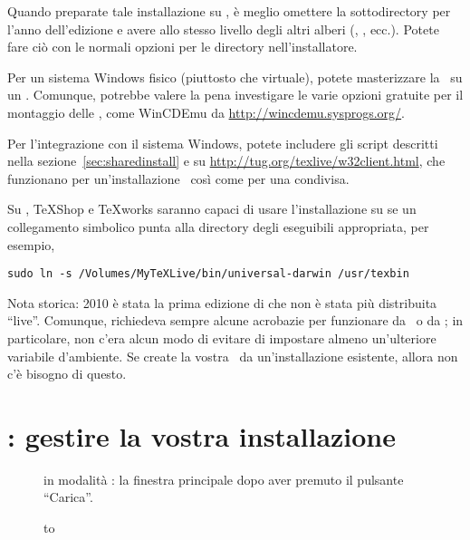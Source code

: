 \documentclass{article}
\begin{document}
Quando preparate tale installazione su \ISO, è meglio omettere la
sottodirectory per l'anno dell'edizione e avere  allo
stesso livello degli altri alberi (,
, ecc.). Potete fare ciò con le normali opzioni per le
directory nell'installatore.

Per un sistema Windows fisico (piuttosto che virtuale), potete masterizzare
la \ISO\ su un . Comunque, potrebbe valere la pena investigare le
varie opzioni gratuite per il montaggio delle \ISO, come WinCDEmu da
\url{http://wincdemu.sysprogs.org/}.

Per l'integrazione con il sistema Windows, potete includere gli script
 descritti nella sezione~\ref{sec:sharedinstall} e su
\url{http://tug.org/texlive/w32client.html}, che funzionano per
un'installazione \ISO\ così come per una condivisa.

Su \MacOSX, TeXShop e \TeX{}works saranno capaci di usare l'installazione su
 se un collegamento simbolico  punta alla
directory degli eseguibili appropriata, per esempio,
\begin{verbatim}
sudo ln -s /Volumes/MyTeXLive/bin/universal-darwin /usr/texbin
\end{verbatim}

Nota storica: \TL{} 2010 è stata la prima edizione di \TL{} che non è stata
più distribuita ``live''. Comunque, richiedeva sempre alcune acrobazie per
funzionare da \DVD\ o da \ISO; in particolare, non c'era alcun modo di
evitare di impostare almeno un'ulteriore variabile d'ambiente. Se create la
vostra \ISO\ da un'installazione esistente, allora non c'è bisogno di
questo.


\section{: gestire la vostra installazione}
\label{sec:tlmgr}

\begin{figure}[tb]
\caption{ in modalità \GUI: la finestra principale dopo aver
  premuto il pulsante ``Carica''.}\label{fig:tlmgr-gui}
\end{figure}

\begin{figure}[tb]
\hbox to 
\end{figure}
\end{document}

